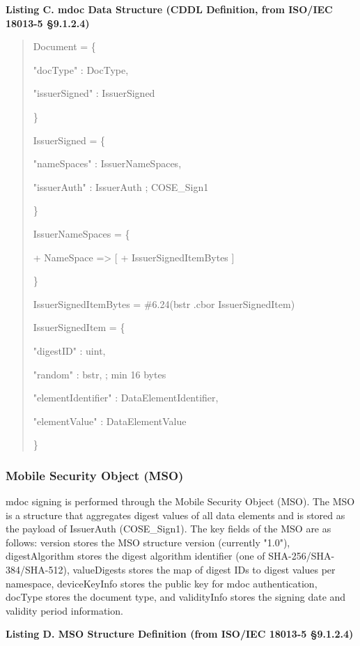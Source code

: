 \documentclass[conference]{IEEEtran}
\begin{document}
\textbf{Listing C. mdoc Data Structure (CDDL Definition, from ISO/IEC 18013-5 §9.1.2.4)}

\begin{quote}
Document = \{

"docType" : DocType,

"issuerSigned" : IssuerSigned

\}

IssuerSigned = \{

"nameSpaces" : IssuerNameSpaces,

"issuerAuth" : IssuerAuth ; COSE\_Sign1

\}

IssuerNameSpaces = \{

+ NameSpace =\textgreater{} {[} + IssuerSignedItemBytes {]}

\}

IssuerSignedItemBytes = \#6.24(bstr .cbor IssuerSignedItem)

IssuerSignedItem = \{

"digestID" : uint,

"random" : bstr, ; min 16 bytes

"elementIdentifier" : DataElementIdentifier,

"elementValue" : DataElementValue

\}
\end{quote}

\subsubsection{Mobile Security Object (MSO)}

mdoc signing is performed through the Mobile Security Object (MSO). The MSO is a structure that aggregates digest values of all data elements and is stored as the payload of IssuerAuth (COSE\_Sign1). The key fields of the MSO are as follows: version stores the MSO structure version (currently "1.0"), digestAlgorithm stores the digest algorithm identifier (one of SHA-256/SHA-384/SHA-512), valueDigests stores the map of digest IDs to digest values per namespace, deviceKeyInfo stores the public key for mdoc authentication, docType stores the document type, and validityInfo stores the signing date and validity period information.

\textbf{Listing D. MSO Structure Definition (from ISO/IEC 18013-5 §9.1.2.4)}
\end{document}
